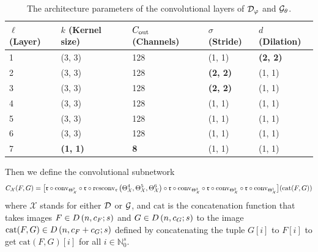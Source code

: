 \documentclass{article}
\newcommand{\Natural}{\mathbb{N}}
\begin{document}
	\begin{table}[t]
		\begin{center}
			\begin{tabular}{@{}lllll@{}}
				\toprule
				\(\ell\) (Layer) & \(k\) (Kernel size) & \({C_{\textnormal{out}}}\) (Channels) & \(\sigma\) (Stride) &  \(d\) (Dilation) \\
				\midrule
				1 & (3, 3) & 128 & (1, 1) & \textbf{(2, 2)} \\
				2 & (3, 3) & 128 & \textbf{(2, 2)} & (1, 1) \\
				3 & (3, 3) & 128 & \textbf{(2, 2)} & (1, 1) \\
				4 & (3, 3) & 128 & (1, 1) & (1, 1) \\
				5 & (3, 3) & 128 & (1, 1) & (1, 1) \\
				6 & (3, 3) & 128 & (1, 1) & (1, 1) \\
				7 & \textbf{(1, 1)} & \textbf{8} & (1, 1) & (1, 1) \\
				\bottomrule
			\end{tabular}
		\end{center}
		\caption{The architecture parameters of the convolutional layers of \(\mathcal{D}_\varphi\) and \(\mathcal{G}_\theta\).}
		\label{table:convolutional_architecture}
	\end{table}
	
	Then we define the convolutional subnetwork
	\newcommand{\cat}{\mathrm{cat}}
	\begin{align}\label{eq:conv_network}
		C_\mathcal{X}(F, G) = \big[\relu \circ\conv_{\xweight^7} \circ \relu \circ \resconv_\relu\left(\xweight^4, \xweight^5, \xweight^6\right) \circ \relu \circ \conv_{\xweight^3} \circ \relu \circ \conv_{\xweight^2} \circ \relu \circ \conv_{\xweight^1}\big] (\cat(F, G))
	\end{align}
	where \(\mathcal{X}\) stands for either \(\mathcal{D}\) or \(\mathcal{G}\), and \(\cat\) is the concatenation function that takes images \(F \in {D\left(n, c_F; s\right)}\) and \(G \in {D\left(n, c_G; s\right)}\) to the image \(\cat(F, G) \in \discim{n}{c_F + c_G}{s}\) defined by concatenating the tuple \(G[i]\) to \(F[i]\) to get \(\cat(F,G)[i]\) for all \(i \in \Natural_0^s\).
	
\end{document}
